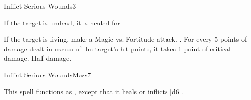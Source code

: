 \begin{spellsection}{Inflict Serious Wounds}{3}
\begin{spellheader}
\end{spellheader}
\begin{spellcontent}
    \begin{spelltargetinginfo}
    \end{spelltargetinginfo}
    \begin{spelleffects}
        \spelleffect If the target is undead, it is healed for .
        \begin{spellattacktriggered}{If the target is living, make a Magic vs. Fortitude attack.}
            \spellsuccess {}. For every 5 points of damage dealt in excess of the target's hit points, it takes 1 point of critical damage.
            \spellfailure Half damage.
        \end{spellattacktriggered}
    \end{spelleffects}
\end{spellcontent}
\begin{spellfooter}
\end{spellfooter}
\end{spellsection}

\begin{spellsection}{Inflict Serious Wounds}{Mass}{7}
\begin{spellheader}
\end{spellheader}
\begin{spellcontent}
    \begin{spelltargetinginfo}
    \end{spelltargetinginfo}
    \begin{spelleffects}
        \spellspecial This spell functions as , except that it heals or inflicts [d6].
    \end{spelleffects}
\end{spellcontent}
\begin{spellfooter}
\end{spellfooter}
\end{spellsection}

